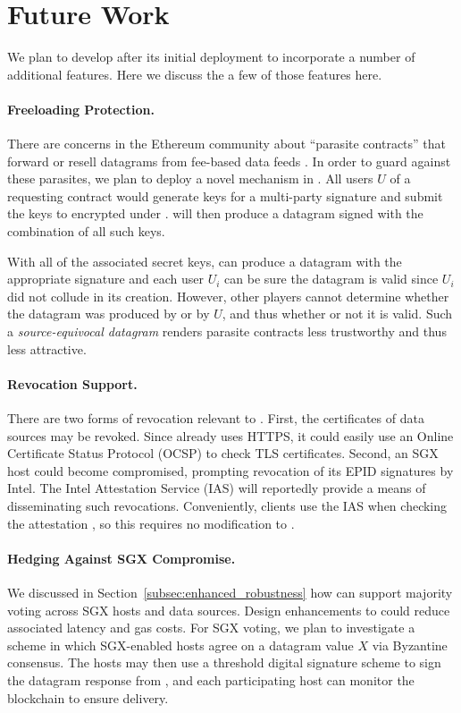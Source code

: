 \section{Future Work}
\label{sec:future-work}

We plan to develop \tc after its initial deployment to incorporate a number of additional features.
Here we discuss the a few of those features here.

\paragraph{Freeloading Protection.}
There are concerns in the Ethereum community about ``parasite contracts'' that forward or resell datagrams from fee-based data feeds \cite{parasite}.
In order to guard against these parasites, we plan to deploy a novel mechanism in \tc.
All users $U$ of a requesting contract would generate keys for a multi-party signature and submit the keys to \tcont encrypted under \pkTC.
\tc will then produce a datagram signed with the combination of all such keys.

With all of the associated secret keys, \tcont can produce a datagram with the appropriate signature and each user $U_i$ can be sure the datagram is valid since $U_i$ did not collude in its creation.
However, other players cannot determine whether the datagram was produced by \tcont or by $U$, and thus whether or not it is valid.
Such a \emph{source-equivocal datagram} renders parasite contracts less trustworthy and thus less attractive.

\paragraph{Revocation Support.}
There are two forms of revocation relevant to \tc.
First, the certificates of data sources may be revoked.
Since \tc already uses HTTPS, it could easily use an Online Certificate Status Protocol (OCSP) to check TLS certificates.
Second, an SGX host could become compromised, prompting revocation of its EPID signatures by Intel.
The Intel Attestation Service (IAS) will reportedly provide a means of disseminating such revocations.
Conveniently, clients use the IAS when checking the attestation \sigatt, so this requires no modification to \tc.

\paragraph{Hedging Against SGX Compromise.}
We discussed in Section~\ref{subsec:enhanced_robustness} how \tc can support majority voting across SGX hosts and data sources.
Design enhancements to \tc could reduce associated latency and gas costs.
For SGX voting, we plan to investigate a scheme in which SGX-enabled \tc hosts agree on a datagram value $X$ via Byzantine consensus.
The hosts may then use a threshold digital signature scheme to sign the datagram response from \tcadd,
and each participating host can monitor the blockchain to ensure delivery.

